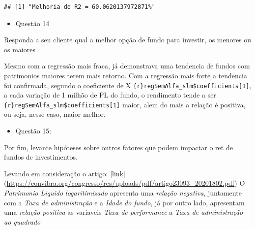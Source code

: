 \documentclass[
]{article}
\newenvironment{Shaded}{\begin{snugshade}}{\end{snugshade}}
\newcommand{\AttributeTok}[1]{\textcolor[rgb]{0.77,0.63,0.00}{#1}}
\newcommand{\DecValTok}[1]{\textcolor[rgb]{0.00,0.00,0.81}{#1}}
\newcommand{\FunctionTok}[1]{\textcolor[rgb]{0.00,0.00,0.00}{#1}}
\newcommand{\NormalTok}[1]{#1}
\newcommand{\SpecialCharTok}[1]{\textcolor[rgb]{0.00,0.00,0.00}{#1}}
\newcommand{\StringTok}[1]{\textcolor[rgb]{0.31,0.60,0.02}{#1}}
\providecommand{\tightlist}{%
  \setlength{\itemsep}{0pt}\setlength{\parskip}{0pt}}
\begin{document}
\begin{Shaded}
\end{Shaded}

\begin{verbatim}
## [1] "Melhoria do R2 = 60.0620137972871%"
\end{verbatim}

\begin{itemize}
\tightlist
\item
  Questão 14
\end{itemize}

Responda a seu cliente qual a melhor opção de fundo para investir, os
menores ou os maiores

Mesmo com a regressão mais fraca, já demonstrava uma tendencia de fundos
com patrimonios maiores terem mais retorno. Com a regressão mais forte a
tendencia foi confirmada, segundo o coeficiente de X
\texttt{\{r\}regSemAlfa\_slm\$coefficients{[}1{]}}, a cada variação de 1
milhão de PL do fundo, o rendimento tende a ser
\texttt{\{r\}regSemAlfa\_slm\$coefficients{[}1{]}} maior, alem do mais a
relação é positiva, ou seja, nesse caso, maior melhor.

\begin{itemize}
\tightlist
\item
  Questão 15:
\end{itemize}

Por fim, levante hipóteses sobre outros fatores que podem impactar o ret
de fundos de investimentos.

Levando em consideração o artigo: {[}link{]}
(\url{https://convibra.org/congresso/res/uploads/pdf/artigo23093_20201802.pdf})
O \emph{Patrimonio Liquido logaritimizado} apresenta uma \emph{relação
negativa}, juntamente com a \emph{Taxa de administração} e a \emph{Idade
do fundo}, já por outro lado, apresentam uma \emph{relação positiva} as
variaveis \emph{Taxa de performance} a \emph{Taxa de administração ao
quadrado}
\end{document}

